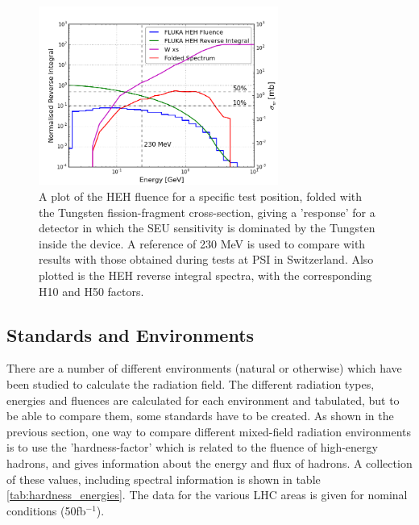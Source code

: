 \begin{figure}[!ht]
	\centering
	\includegraphics[width=0.7\textwidth]{./images/w_folded_spectrum3}
	\caption{A plot of the HEH fluence for a specific test position, folded with the Tungsten fission-fragment cross-section, giving a 'response' for a detector in which the SEU sensitivity is dominated by the Tungsten inside the device. A reference of 230 MeV is used to compare with results with those obtained during tests at PSI in Switzerland. Also plotted is the HEH reverse integral spectra, with the corresponding H10 and H50 factors.}
	\label{fig:w_factor_example}
\end{figure}

\clearpage
\subsection{Standards and Environments}

There are a number of different environments (natural or otherwise) which have been studied to calculate the radiation field. The different radiation types, energies and fluences are calculated  for each environment and tabulated, but to be able to compare them, some standards have to be created. As shown in the previous section, one way to compare different mixed-field radiation environments is to use the 'hardness-factor' which is related to the fluence of high-energy hadrons, and gives information about the energy and flux of hadrons. A collection of these values, including spectral information is shown in table \ref{tab:hardness_energies}. The data for the various LHC areas is given for nominal conditions (50fb$^{-1}$). \\


